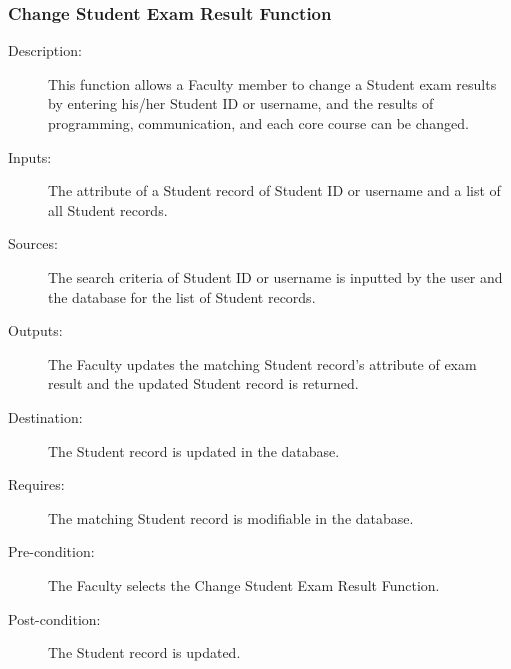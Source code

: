 \subsubsection{\large Change Student Exam Result Function} 
\begin{boxed} %
\begin{description}
\item[Description:]
   This function allows a Faculty member to change a Student exam results by
   entering his/her Student ID or username, and the results of programming,
   communication, and each core course can be changed.
\item[Inputs:]
   The attribute of a Student record of Student ID or username and a list of all
   Student records.
\item[Sources:]
   The search criteria of Student ID or username is inputted by the user and the
   database for the list of Student records.
\item[Outputs:]
   The Faculty updates the matching Student record's attribute of exam result
   and the updated Student record is returned.
\item[Destination:]
   The Student record is updated in the database.
\item[Requires:]
   The matching Student record is modifiable in the database.
\item[Pre-condition:]
   The Faculty selects the Change Student Exam Result Function.
\item[Post-condition:]
   The Student record is updated.
\end{description}
\end{boxed} %

